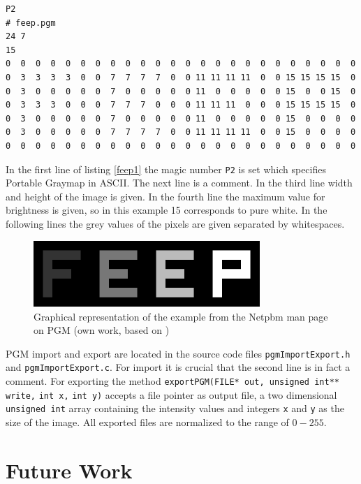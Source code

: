 \begin{minipage}{\linewidth}
\begin{lstlisting}[caption={PGM example from the Netpbm man page on PGM\cite{pgmNetPBM}},label=feep1,captionpos=b]
P2
# feep.pgm
24 7
15
0  0  0  0  0  0  0  0  0  0  0  0  0  0  0  0  0  0  0  0  0  0  0  0
0  3  3  3  3  0  0  7  7  7  7  0  0 11 11 11 11  0  0 15 15 15 15  0
0  3  0  0  0  0  0  7  0  0  0  0  0 11  0  0  0  0  0 15  0  0 15  0
0  3  3  3  0  0  0  7  7  7  0  0  0 11 11 11  0  0  0 15 15 15 15  0
0  3  0  0  0  0  0  7  0  0  0  0  0 11  0  0  0  0  0 15  0  0  0  0
0  3  0  0  0  0  0  7  7  7  7  0  0 11 11 11 11  0  0 15  0  0  0  0
0  0  0  0  0  0  0  0  0  0  0  0  0  0  0  0  0  0  0  0  0  0  0  0
\end{lstlisting}
\end{minipage}
\par In the first line of listing \ref{feep1} the magic number \verb!P2! is set which specifies Portable Graymap in ASCII. The next line is a comment. In the third line width and height of the image is given. In the fourth line the maximum value for brightness is given, so in this example 15 corresponds to pure white. In the following lines the grey values of the pixels are given separated by whitespaces.
\begin{figure}[h]
	\centering
	\includegraphics[height=2.5cm]{images/feep.png}
	\caption{Graphical representation of the example from the Netpbm man page on PGM (own work, based on \cite{pgmNetPBM})}
	\label{feep2}
\end{figure}
\par PGM import and export are located in the source code files \verb!pgmImportExport.h! and \verb!pgmImportExport.c!. For import it is crucial that the second line is in fact a comment. For exporting the method \verb!exportPGM(FILE* out, unsigned int** write,! \verb!int x,! \verb!int y)! accepts a file pointer as output file, a two dimensional \verb!unsigned int! array containing the intensity values and integers \verb!x! and \verb!y! as the size of the image. All exported files are normalized to the range of \(0-255\).
\section{Future Work}
